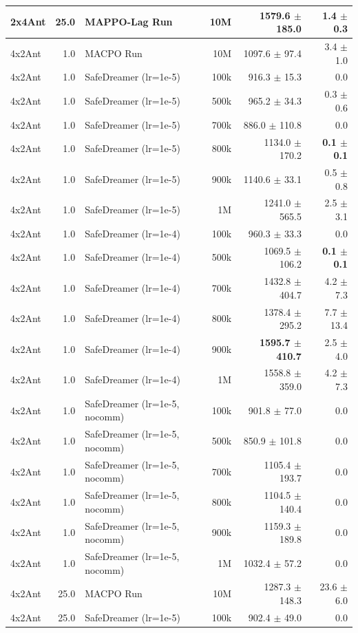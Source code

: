 \begin{longtable}{l r l r r r}
2x4Ant & 25.0 & MAPPO-Lag Run & 10M & 1579.6 $\pm$ 185.0 & 1.4 $\pm$ 0.3 \\
\midrule
4x2Ant & 1.0 & MACPO Run & 10M & 1097.6 $\pm$ 97.4 & 3.4 $\pm$ 1.0 \\
4x2Ant & 1.0 & SafeDreamer (lr=1e-5) & 100k & 916.3 $\pm$ 15.3 & 0.0 \\
4x2Ant & 1.0 & SafeDreamer (lr=1e-5) & 500k & 965.2 $\pm$ 34.3 & 0.3 $\pm$ 0.6 \\
4x2Ant & 1.0 & SafeDreamer (lr=1e-5) & 700k & 886.0 $\pm$ 110.8 & 0.0 \\
4x2Ant & 1.0 & SafeDreamer (lr=1e-5) & 800k & 1134.0 $\pm$ 170.2 & \textbf{0.1 $\pm$ 0.1} \\
4x2Ant & 1.0 & SafeDreamer (lr=1e-5) & 900k & 1140.6 $\pm$ 33.1 & 0.5 $\pm$ 0.8 \\
4x2Ant & 1.0 & SafeDreamer (lr=1e-5) & 1M & 1241.0 $\pm$ 565.5 & 2.5 $\pm$ 3.1 \\
4x2Ant & 1.0 & SafeDreamer (lr=1e-4) & 100k & 960.3 $\pm$ 33.3 & 0.0 \\
4x2Ant & 1.0 & SafeDreamer (lr=1e-4) & 500k & 1069.5 $\pm$ 106.2 & \textbf{0.1 $\pm$ 0.1} \\
4x2Ant & 1.0 & SafeDreamer (lr=1e-4) & 700k & 1432.8 $\pm$ 404.7 & 4.2 $\pm$ 7.3 \\
4x2Ant & 1.0 & SafeDreamer (lr=1e-4) & 800k & 1378.4 $\pm$ 295.2 & 7.7 $\pm$ 13.4 \\
4x2Ant & 1.0 & SafeDreamer (lr=1e-4) & 900k & \textbf{1595.7 $\pm$ 410.7} & 2.5 $\pm$ 4.0 \\
4x2Ant & 1.0 & SafeDreamer (lr=1e-4) & 1M & 1558.8 $\pm$ 359.0 & 4.2 $\pm$ 7.3 \\
4x2Ant & 1.0 & SafeDreamer (lr=1e-5, nocomm) & 100k & 901.8 $\pm$ 77.0 & 0.0 \\
4x2Ant & 1.0 & SafeDreamer (lr=1e-5, nocomm) & 500k & 850.9 $\pm$ 101.8 & 0.0 \\
4x2Ant & 1.0 & SafeDreamer (lr=1e-5, nocomm) & 700k & 1105.4 $\pm$ 193.7 & 0.0 \\
4x2Ant & 1.0 & SafeDreamer (lr=1e-5, nocomm) & 800k & 1104.5 $\pm$ 140.4 & 0.0 \\
4x2Ant & 1.0 & SafeDreamer (lr=1e-5, nocomm) & 900k & 1159.3 $\pm$ 189.8 & 0.0 \\
4x2Ant & 1.0 & SafeDreamer (lr=1e-5, nocomm) & 1M & 1032.4 $\pm$ 57.2 & 0.0 \\
\midrule
4x2Ant & 25.0 & MACPO Run & 10M & 1287.3 $\pm$ 148.3 & 23.6 $\pm$ 6.0 \\
4x2Ant & 25.0 & SafeDreamer (lr=1e-5) & 100k & 902.4 $\pm$ 49.0 & 0.0 \\

\end{longtable}
